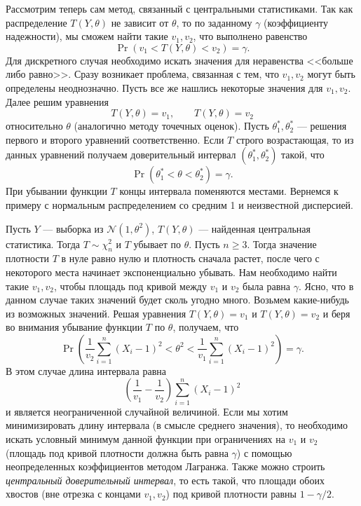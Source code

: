 Рассмотрим теперь сам метод, связанный с центральными статистиками.
Так как распределение $T(Y, \theta)$ не зависит от $\theta$, то по заданному $\gamma$ (коэффициенту надежности), мы сможем найти такие $v_1, v_2$, что выполнено равенство
\[
    \Pr(v_1 < T(Y, \theta) < v_2) = \gamma.    
\]
Для дискретного случая необходимо искать значения для неравенства <<больше либо равно>>.
Сразу возникает проблема, связанная с тем, что $v_1, v_2$ могут быть определены неоднозначно.
Пусть все же нашлись некоторые значения для $v_1, v_2$.
Далее решим уравнения
\[
    T(Y, \theta) = v_1, \qquad T(Y, \theta) = v_2
\]
относительно $\theta$ (аналогично методу точечных оценок).
Пусть $\theta_1^*, \theta_2^*$ --- решения первого и второго уравнений соответственно.
Если $T$ строго возрастающая, то из данных уравнений получаем доверительный интервал $(\theta_1^*, \theta_2^*)$ такой, что
\[
    \Pr(\theta_1^* < \theta < \theta_2^*) = \gamma.
\]
При убывании функции $T$ концы интервала поменяются местами.
Вернемся к примеру с нормальным распределением со средним 1 и неизвестной дисперсией.
\begin{example}
    Пусть $Y$ --- выборка из $\mathcal{N}(1, \theta^2)$, $T(Y, \theta)$ --- найденная центральная статистика.
    Тогда $T \sim \chi_n^2$ и $T$ убывает по $\theta$.
    Пусть $n \geqslant 3$. Тогда значение плотности $T$  в нуле равно нулю и плотность сначала растет, после чего с некоторого места начинает экспоненциально убывать.
    Нам необходимо найти такие $v_1, v_2$, чтобы площадь под кривой между $v_1$ и $v_2$ была равна $\gamma$.
    Ясно, что в данном случае таких значений будет сколь угодно много.
    Возьмем какие-нибудь из возможных значений.
    Решая уравнения $T(Y, \theta) = v_1$ и $T(Y, \theta) = v_2$ и беря во внимания убывание функции $T$ по $\theta$, получаем, что
    \[
        \Pr\left( \frac{1}{v_2} \sum_{i=1}^n (X_i-1)^2 < \theta^2 < \frac{1}{v_1} \sum_{i=1}^n (X_i - 1)^2 \right) = \gamma.
    \]
    В этом случае длина интервала равна
    \[
        \left(\frac1{v_1} - \frac1{v_2}\right) \sum_{i=1}^n(X_i-1)^2
    \]
и является неограниченной случайной величиной.
    Если мы хотим минимизировать длину интервала (в смысле среднего значения), то необходимо искать условный минимум данной функции при ограничениях на $v_1$ и $v_2$ (площадь под кривой плотности должна быть равна $\gamma$) с помощью неопределенных коэффициентов методом Лагранжа.
    Также можно строить \emph{центральный доверительный интервал}, то есть такой, что площади обоих хвостов (вне отрезка с концами $v_1, v_2$) под кривой плотности равны $1 - \gamma / 2$.
\end{example}
